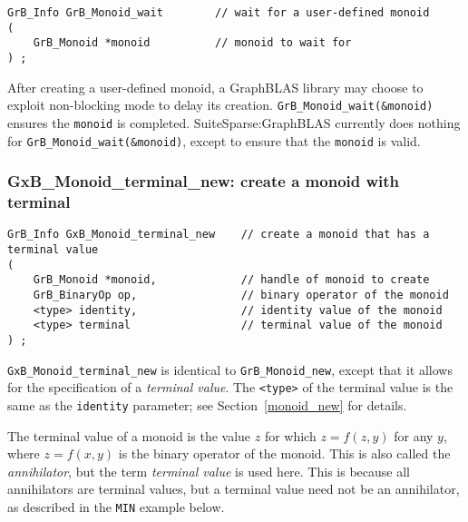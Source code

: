 \documentclass[12pt]{article}
\begin{document}
\begin{mdframed}[userdefinedwidth=6in]
{\footnotesize
\begin{verbatim}
GrB_Info GrB_Monoid_wait        // wait for a user-defined monoid
(
    GrB_Monoid *monoid          // monoid to wait for
) ;
\end{verbatim}
}\end{mdframed}

After creating a user-defined monoid, a GraphBLAS library may choose to exploit
non-blocking mode to delay its creation.  \verb'GrB_Monoid_wait(&monoid)'
ensures the \verb'monoid' is completed.  SuiteSparse:GraphBLAS currently does
nothing for \verb'GrB_Monoid_wait(&monoid)', except to ensure that the
\verb'monoid' is valid.

\newpage
\subsubsection{{\sf GxB\_Monoid\_terminal\_new:} create a monoid with terminal}
\label{monoid_terminal_new}

\begin{mdframed}[userdefinedwidth=6in]
{\footnotesize
\begin{verbatim}
GrB_Info GxB_Monoid_terminal_new    // create a monoid that has a terminal value
(
    GrB_Monoid *monoid,             // handle of monoid to create
    GrB_BinaryOp op,                // binary operator of the monoid
    <type> identity,                // identity value of the monoid
    <type> terminal                 // terminal value of the monoid
) ;
\end{verbatim}
} \end{mdframed}

\verb'GxB_Monoid_terminal_new' is identical to \verb'GrB_Monoid_new', except
that it allows for the specification of a {\em terminal value}.  The
\verb'<type>' of the terminal value is the same as the \verb'identity'
parameter; see Section~\ref{monoid_new} for details.

The terminal value of a monoid is the value $z$ for which $z=f(z,y)$ for any
$y$, where $z=f(x,y)$ is the binary operator of the monoid.  This is also
called the {\em annihilator}, but the term {\em terminal value} is used here.
This is because all annihilators are terminal values, but a terminal value need
not be an annihilator, as described in the \verb'MIN' example below.
\end{document}
